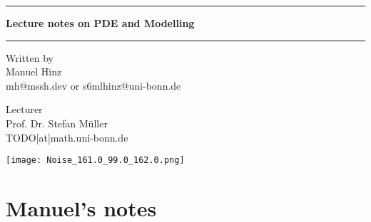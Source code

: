 \documentclass[a4paper, 10pt, oneside]{book}
\author{Manuel Hinz}
\begin{document}
\pagecolor{mycolor}
\begin{titlepage}
    \centering

    \vspace*{1cm}

    {\color{white}\rule{\textwidth}{1pt}}

    \vspace{.7\baselineskip}
    {\huge {\color{white}\textbf{Lecture notes on PDE and Modelling}}}

    {\color{white}\rule{\textwidth}{1pt}}

    \vspace{1.5cm}

    \large

    \begin{minipage}{.5\textwidth}
        \color{white}
        \centering
        Written by \\
        Manuel Hinz\\
        {\normalsize mh@mssh.dev or s6mlhinz@uni-bonn.de}
    \end{minipage}%
    \begin{minipage}{.5\textwidth}
        \color{white}
        \centering
        Lecturer\\
        Prof. Dr. Stefan Müller  \\
        {\normalsize TODO[at]math.uni-bonn.de}
    \end{minipage}


    \vspace{3cm}

    \texttt{[image: Noise\_161.0\_99.0\_162.0.png]}

    \vfill

    \color{white}{
    University of Bonn \\
    Summer semester 2025\\
    Last update: \today
    }
   
\end{titlepage}
\pagecolor{white}
\tableofcontents

\restoregeometry
\setcounter{chapter}{-1}
\chapter{Manuel's notes}



\end{document}
